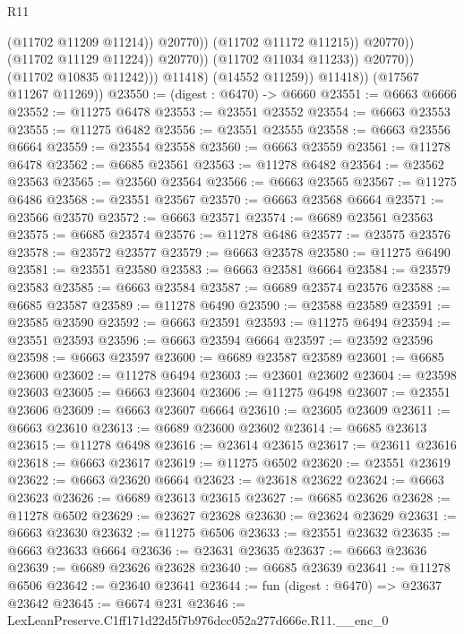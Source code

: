 \begin{lexlean}{R11}
\begin{coremodule}
                                          (@11702 @11209 @11214))
                                        @20770))
                                    (@11702 @11172 @11215))
                                  @20770))
                              (@11702 @11129 @11224))
                            @20770))
                        (@11702 @11034 @11233))
                      @20770))
                  (@11702 @10835 @11242)))
              @11418)
            (@14552 @11259))
          @11418))
      (@17567 @11267 @11269))
@23550 := (digest : @6470) -> @6660
@23551 := @6663 @6666
@23552 := @11275 @6478
@23553 := @23551 @23552
@23554 := @6663 @23553
@23555 := @11275 @6482
@23556 := @23551 @23555
@23558 := @6663 @23556 @6664
@23559 := @23554 @23558
@23560 := @6663 @23559
@23561 := @11278 @6478
@23562 := @6685 @23561
@23563 := @11278 @6482
@23564 := @23562 @23563
@23565 := @23560 @23564
@23566 := @6663 @23565
@23567 := @11275 @6486
@23568 := @23551 @23567
@23570 := @6663 @23568 @6664
@23571 := @23566 @23570
@23572 := @6663 @23571
@23574 := @6689 @23561 @23563
@23575 := @6685 @23574
@23576 := @11278 @6486
@23577 := @23575 @23576
@23578 := @23572 @23577
@23579 := @6663 @23578
@23580 := @11275 @6490
@23581 := @23551 @23580
@23583 := @6663 @23581 @6664
@23584 := @23579 @23583
@23585 := @6663 @23584
@23587 := @6689 @23574 @23576
@23588 := @6685 @23587
@23589 := @11278 @6490
@23590 := @23588 @23589
@23591 := @23585 @23590
@23592 := @6663 @23591
@23593 := @11275 @6494
@23594 := @23551 @23593
@23596 := @6663 @23594 @6664
@23597 := @23592 @23596
@23598 := @6663 @23597
@23600 := @6689 @23587 @23589
@23601 := @6685 @23600
@23602 := @11278 @6494
@23603 := @23601 @23602
@23604 := @23598 @23603
@23605 := @6663 @23604
@23606 := @11275 @6498
@23607 := @23551 @23606
@23609 := @6663 @23607 @6664
@23610 := @23605 @23609
@23611 := @6663 @23610
@23613 := @6689 @23600 @23602
@23614 := @6685 @23613
@23615 := @11278 @6498
@23616 := @23614 @23615
@23617 := @23611 @23616
@23618 := @6663 @23617
@23619 := @11275 @6502
@23620 := @23551 @23619
@23622 := @6663 @23620 @6664
@23623 := @23618 @23622
@23624 := @6663 @23623
@23626 := @6689 @23613 @23615
@23627 := @6685 @23626
@23628 := @11278 @6502
@23629 := @23627 @23628
@23630 := @23624 @23629
@23631 := @6663 @23630
@23632 := @11275 @6506
@23633 := @23551 @23632
@23635 := @6663 @23633 @6664
@23636 := @23631 @23635
@23637 := @6663 @23636
@23639 := @6689 @23626 @23628
@23640 := @6685 @23639
@23641 := @11278 @6506
@23642 := @23640 @23641
@23644 := fun (digest : @6470) => @23637 @23642
@23645 := @6674 @231
@23646 := LexLeanPreserve.C1ff171d22d5f7b976dcc052a277d666e.R11.__enc_0

\end{coremodule}
\end{lexlean}
